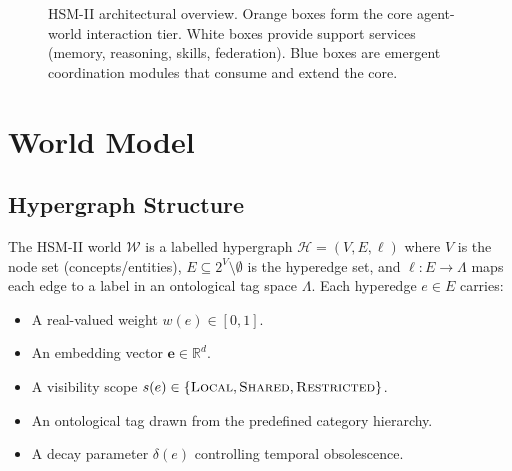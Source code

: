 \documentclass[11pt]{article}
\begin{document}
\begin{figure}[H]
\caption{HSM-II architectural overview. Orange boxes form the core agent-world
interaction tier. White boxes provide support services (memory, reasoning, skills,
federation). Blue boxes are emergent coordination modules that consume and extend
the core.}
\label{fig:arch}
\end{figure}

\section{World Model}
\label{sec:world}

\subsection{Hypergraph Structure}

The HSM-II world $\mathcal{W}$ is a labelled hypergraph
$\mathcal{H} = (V, E, \ell)$ where $V$ is the node set (concepts/entities),
$E \subseteq 2^V \setminus \emptyset$ is the hyperedge set, and
$\ell : E \to \Lambda$ maps each edge to a label in an ontological tag space
$\Lambda$. Each hyperedge $e \in E$ carries:

\begin{itemize}[noitemsep,topsep=4pt]
  \item A real-valued weight $w(e) \in [0,1]$.
  \item An embedding vector $\mathbf{e} \in \mathbb{R}^d$.
  \item A visibility scope $s(e) \in \{\textsc{Local}, \textsc{Shared},
    \textsc{Restricted}\}$.
  \item An ontological tag drawn from the predefined category hierarchy.
  \item A decay parameter $\delta(e)$ controlling temporal obsolescence.
\end{itemize}
\end{document}
